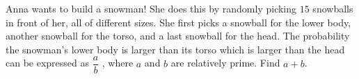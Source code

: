 Anna wants to build a snowman! She does this by randomly picking $15$ snowballs in front of her, all of different sizes. She first picks a snowball for the lower body, another snowball for the torso, and a last snowball for the head. The probability the snowman's lower body is larger than its torso which is larger than the head can be expressed as $\dfrac{a}{b}$ , where $a$ and $b$ are relatively prime. Find $a + b$.
